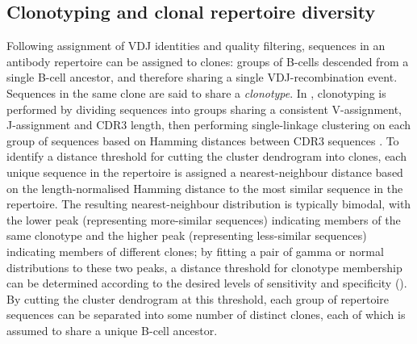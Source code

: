 \subsection{Clonotyping and clonal repertoire diversity}
\label{sec:igseq_pilot_clones}

Following assignment of VDJ identities and quality filtering, sequences in an antibody repertoire can be assigned to clones: groups of B-cells descended from a single \naive B-cell ancestor, and therefore sharing a single VDJ-recombination event. Sequences in the same clone are said to share a \textit{clonotype}. In , clonotyping is performed by dividing sequences into groups sharing a consistent V-assignment, J-assignment and CDR3 length, then performing single-linkage clustering on each group of sequences based on Hamming distances between CDR3 sequences \parencite{gupta2017hierarchical}. To identify a distance threshold for cutting the cluster dendrogram into clones, each unique sequence in the repertoire is assigned a nearest-neighbour distance based on the length-normalised Hamming distance to the most similar sequence in the repertoire. The resulting nearest-neighbour distribution is typically bimodal, with the lower peak (representing more-similar sequences) indicating members of the same clonotype and the higher peak (representing less-similar sequences) indicating members of different clones; by fitting a pair of gamma or normal distributions to these two peaks, a distance threshold for clonotype membership can be determined according to the desired levels of sensitivity and specificity \parencite{nouri2018threshold} (). By cutting the cluster dendrogram at this threshold, each group of repertoire sequences can be separated into some number of distinct clones, each of which is assumed to share a unique \naive B-cell ancestor.

